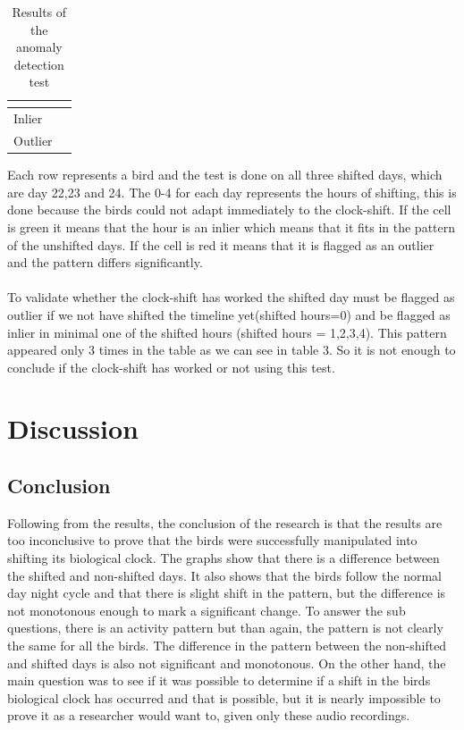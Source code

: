 \documentclass[a4paper]{article}
\begin{document}
\begin{table}[H]
\begin{tabular}{llllllllllllllll}
\multicolumn{16}{l}{} \\ \hline
\multicolumn{1}{|l|}{Inlier} & \multicolumn{15}{l|}{\cellcolor[HTML]{67FD9A}} \\ \hline
\multicolumn{1}{|l|}{Outlier} & \multicolumn{15}{l|}{\cellcolor[HTML]{FD6864}} \\ \hline
\end{tabular}
\caption{Results of the anomaly detection test}
\label{my-label}
\end{table}
Each row represents a bird and the test is done on all three shifted days, which are day 22,23 and 24. The 0-4 for each day represents the hours of shifting, this is done because the birds could not adapt immediately to the clock-shift. If the cell is green it means that the hour is an inlier which means that it fits in the pattern of the unshifted days. If the cell is red it means that it is flagged as an outlier and the pattern differs significantly.\\\\
To validate whether the clock-shift has worked the shifted day must be flagged as outlier if we not have shifted the timeline yet(shifted hours=0) and be flagged as inlier in minimal one of the shifted hours (shifted hours = 1,2,3,4). This pattern appeared only 3 times in the table as we can see in table 3. So it is not enough to conclude if the clock-shift has worked or not using this test. 


\section*{Discussion}
    \subsection*{Conclusion}
        Following from the results, the conclusion of the research is that the results are too inconclusive to prove that the birds were successfully manipulated into shifting its biological clock. The graphs show that there is a difference between the shifted and non-shifted days. It also shows that the birds follow the normal day night cycle and that there is slight shift in the pattern, but the difference is not monotonous enough to mark a significant change. To answer the sub questions, there is an activity pattern but than again, the pattern is not clearly the same for all the birds. The difference in the pattern between the non-shifted and shifted days is also not significant and monotonous. On the other hand, the main question was to see if it was possible to determine if a shift in the birds biological clock has occurred and that is possible, but it is nearly impossible to prove it as a researcher would want to, given only these audio recordings.
\end{document}
